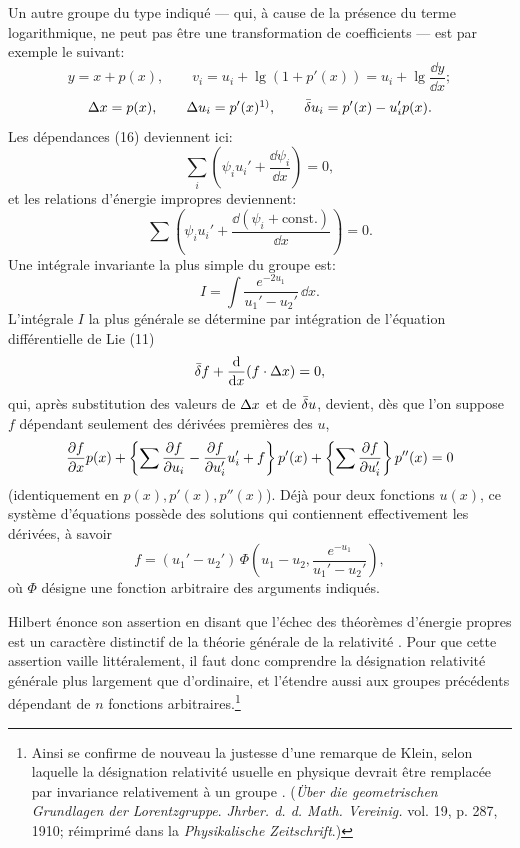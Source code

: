 Un autre groupe du type indiqué --- qui, à cause de la présence du terme logarithmique, ne peut pas être une transformation de coefficients --- est par exemple le suivant:
\[
y=x+p(x),\qquad
v_i=u_i+\lg(1+p'(x))=u_i+\lg\frac{\dd y}{\dd x};
\]
\[
\D x=p(x),\qquad
\D u_i=p'(x)\srcfnmark{1)},\qquad
\bd u_i=p'(x)-u_i'p(x).
\]
Les dépendances (16) deviennent ici:
\[
\sum_i\left(\psi_i u_i'+\frac{\dd\psi_i}{\dd x}\right)=0,
\]
et les relations d'énergie impropres deviennent:
\[
\sum\left(\psi_i u_i'+
\frac{\dd(\psi_i+\mathrm{const.})}{\dd x}\right)=0.
\]
Une intégrale invariante la plus simple du groupe est:
\[
I=\int \frac{e^{-2u_1}}{u_1'-u_2'}\,\dd x.
\]
L'intégrale \(I\) la plus générale se détermine par intégration de l'équation différentielle de Lie (11)
\[
\bar{\delta} f+\frac{\mathrm d}{\mathrm d x}(f\cdot \Delta x)=0,
\]
qui, après substitution des valeurs de \(\Delta x\) et de \(\bar{\delta} u\), devient, dès que l'on suppose \(f\) dépendant seulement des dérivées premières des \(u\),
\[
\frac{\partial f}{\partial x}p(x)
+\left\{\sum\frac{\partial f}{\partial u_i}
-\frac{\partial f}{\partial u_i'}u_i'+f\right\}p'(x)
+\left\{\sum\frac{\partial f}{\partial u_i'}\right\}p''(x)=0
\]
(identiquement en \(p(x),p'(x),p''(x)\)). Déjà pour deux fonctions \(u(x)\), ce système d'équations possède des solutions qui contiennent effectivement les dérivées, à savoir
\[
f=(u_1'-u_2')\,
\Phi\!\left(u_1-u_2,\frac{e^{-u_1}}{u_1'-u_2'}\right),
\]
où \(\Phi\) désigne une fonction arbitraire des arguments indiqués.

Hilbert énonce son assertion en disant que l'échec des théorèmes d'énergie propres est un caractère distinctif de la \og théorie générale de la relativité \fg{}. Pour que cette assertion vaille littéralement, il faut donc comprendre la désignation \og relativité générale \fg{} plus largement que d'ordinaire, et l'étendre aussi aux groupes précédents dépendant de \(n\) fonctions arbitraires.\footnote{Ainsi se confirme de nouveau la justesse d'une remarque de Klein, selon laquelle la désignation \og relativité \fg{} usuelle en physique devrait être remplacée par \og invariance relativement à un groupe \fg{}. (\emph{Über die geometrischen Grundlagen der Lorentzgruppe}. \emph{Jhrber. d. d. Math. Vereinig.} vol. 19, p. 287, 1910; réimprimé dans la \emph{Physikalische Zeitschrift}.)}
